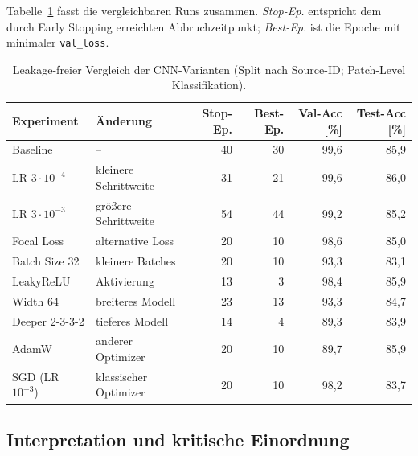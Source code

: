 Tabelle~\ref{tab:cnn_runs_clean} fasst die vergleichbaren Runs zusammen. \textit{Stop-Ep.} entspricht dem durch Early Stopping erreichten Abbruchzeitpunkt; \textit{Best-Ep.} ist die Epoche mit minimaler \texttt{val\_loss}.

\begin{table}[h]
\centering
\footnotesize
\caption{Leakage-freier Vergleich der CNN-Varianten (Split nach Source-ID; Patch-Level Klassifikation).}
\begin{tabular}{llrrrr}
    \toprule
    \textbf{Experiment} & \textbf{Änderung} & \textbf{Stop-Ep.} & \textbf{Best-Ep.} & \textbf{Val-Acc [\%]} & \textbf{Test-Acc [\%]} \\
    \midrule
    Baseline & -- & 40 & 30 & 99,6 & 85,9 \\
    LR $3\cdot10^{-4}$ & kleinere Schrittweite & 31 & 21 & 99,6 & 86,0 \\
    LR $3\cdot10^{-3}$ & größere Schrittweite & 54 & 44 & 99,2 & 85,2 \\
    Focal Loss & alternative Loss & 20 & 10 & 98,6 & 85,0 \\
    Batch Size 32 & kleinere Batches & 20 & 10 & 93,3 & 83,1 \\
    LeakyReLU & Aktivierung & 13 & 3 & 98,4 & 85,9 \\
    Width 64 & breiteres Modell & 23 & 13 & 93,3 & 84,7 \\
    Deeper 2-3-3-2 & tieferes Modell & 14 & 4 & 89,3 & 83,9 \\
    AdamW & anderer Optimizer & 20 & 10 & 89,7 & 85,9 \\
    \acs{SGD} (LR $10^{-3}$) & klassischer Optimizer & 20 & 10 & 98,2 & 83,7 \\
    \bottomrule
\end{tabular}
\label{tab:cnn_runs_clean}
\end{table}

\subsection{Interpretation und kritische Einordnung}
\label{subsec:cnn_interpretation}

